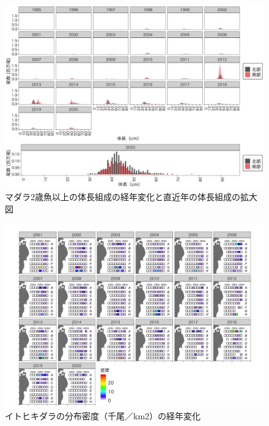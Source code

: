\documentclass[11pt]{article} %
\begin{document}
\begin{linenumbers}
\begin{figure}[h]
  \centering
  \includegraphics[width = 14cm]{マダラ2+length.png}
  \caption{マダラ2歳魚以上の体長組成の経年変化と直近年の体長組成の拡大図}
\end{figure}

\begin{figure}[h]
  \centering
  \includegraphics[width = 14cm]{イトヒキダラdens.png}
  \caption{イトヒキダラの分布密度（千尾／km2）の経年変化}
\end{figure}


\end{linenumbers}
\end{document}
